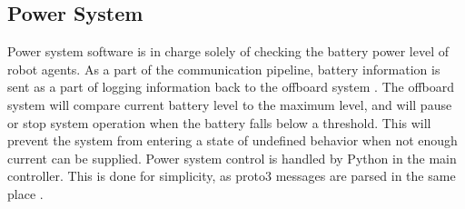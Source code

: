 
\subsection{Power System}
\label{sec:software_power}
Power system software is in charge solely of checking the battery power level of robot agents. As a part of the communication pipeline, battery information is sent as a part of logging information back to the offboard system . The offboard system will compare current battery level to the maximum level, and will pause or stop system operation when the battery falls below a threshold. This will prevent the system from entering a state of undefined behavior when not enough current can be supplied. Power system control is handled by Python \cite{python27} in the main controller. This is done for simplicity, as proto3 messages are parsed in the same place .